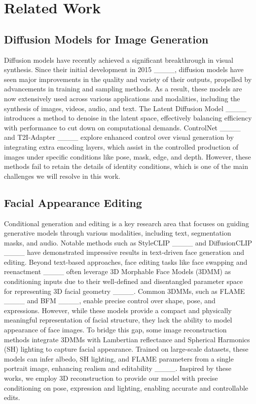 \section{Related Work}
\subsection{Diffusion Models for Image Generation}
Diffusion models have recently achieved a significant breakthrough in visual synthesis. Since their initial development in 2015 ____, diffusion models have seen major improvements in the quality and variety of their outputs, propelled by advancements in training and sampling methods. As a result, these models are now extensively used across various applications and modalities, including the synthesis of images, videos, audio, and text. The Latent Diffusion Model ____ introduces a method to denoise in the latent space, effectively balancing efficiency with performance to cut down on computational demands. ControlNet ____ and T2I-Adapter ____ explore enhanced control over visual generation by integrating extra encoding layers, which assist in the controlled production of images under specific conditions like pose, mask, edge, and depth. However, these methods fail to retain the details of identity conditions, which is one of the main challenges we will resolve in this work.



\subsection{Facial Appearance Editing}
Conditional generation and editing is a key research area that focuses on guiding generative models through various modalities, including text, segmentation masks, and audio. Notable methods such as StyleCLIP ____ and DiffusionCLIP ____ have demonstrated impressive results in text-driven face generation and editing. Beyond text-based approaches, face editing tasks like face swapping and reenactment ____ often leverage 3D Morphable Face Models (3DMM) as conditioning inputs due to their well-defined and disentangled parameter space for representing 3D facial geometry ____. Common 3DMMs, such as FLAME ____ and BFM ____, enable precise control over shape, pose, and expressions. However, while these models provide a compact and physically meaningful representation of facial structure, they lack the ability to model appearance of face images. To bridge this gap, some image reconstruction methods integrate 3DMMs with Lambertian reflectance and Spherical Harmonics (SH) lighting to capture facial appearance. Trained on large-scale datasets, these models can infer albedo, SH lighting, and FLAME parameters from a single portrait image, enhancing realism and editability ____. Inspired by these works, we employ 3D reconstruction to provide our model with precise conditioning on pose, expression and lighting, enabling accurate and controllable edits.
 



